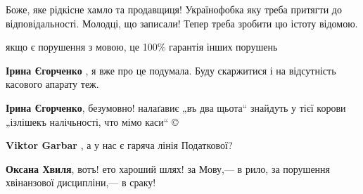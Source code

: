 \begin{itemize}
Боже, яке рідкісне хамло та продавщиця! Українофобка яку треба притягти до
відповідальності. Молодці, що записали! Тепер треба зробити цю істоту відомою.


 

якщо є порушення з мовою, це 100\% гарантія інших порушень

\begin{itemize}
 
\textbf{Ірина Єгорченко} , я вже про це подумала. Буду скаржитися і на відсутність касового апарату теж.

 
\textbf{Ірина Єгорченко}, безумовно! налаґавиє „въ два щьота“ знайдуть у тієї корови „ізлішекъ налічьності, что мімо каси“ ©

 
\textbf{Viktor Garbar} , а у нас є гаряча лінія Податкової?

 
\textbf{Оксана Хвиля}, вотъ! ето хароший шлях! за Мову,— в рило, за порушення хвінанзової дисципліни,— в сраку!

 

\end{itemize}
\end{itemize}
